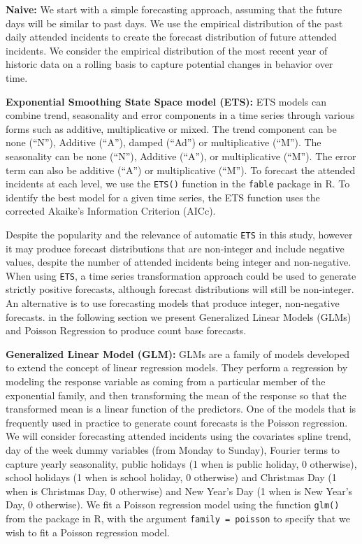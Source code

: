 \documentclass[
  authoryear,
  preprint,
  3p]{elsarticle}
\begin{document}
\textbf{Naive:} We start with a simple forecasting approach, assuming
that the future days will be similar to past days. We use the empirical
distribution of the past daily attended incidents to create the forecast
distribution of future attended incidents. We consider the empirical
distribution of the most recent year of historic data on a rolling basis
to capture potential changes in behavior over
time.

\textbf{Exponential Smoothing State Space model (ETS):} ETS models
\citep{hyndman2021forecasting} can combine trend, seasonality and error
components in a time series through various forms such as additive,
multiplicative or mixed. The trend component can be none (``N''),
Additive (``A''), damped (``Ad'') or multiplicative (``M''). The
seasonality can be none (``N''), Additive (``A''), or multiplicative
(``M''). The error term can also be additive (``A'') or multiplicative
(``M''). To forecast the attended incidents at each level, we use the
\texttt{ETS()} function in the \texttt{fable} package \citep{fable2022}
in R. To identify the best model for a given time series, the ETS
function uses the corrected Akaike's Information Criterion (AICc).

Despite the popularity and the relevance of automatic \texttt{ETS} in
this study, however it may produce forecast distributions that are
non-integer and include negative values, despite the number of attended
incidents being integer and non-negative. When using \texttt{ETS}, a
time series transformation approach could be used to generate strictly
positive forecasts, although forecast distributions will still be
non-integer. An alternative is to use forecasting models that produce
integer, non-negative forecasts. in the following section we present
Generalized Linear Models (GLMs) and Poisson Regression to produce count
base forecasts.

\textbf{Generalized Linear Model (GLM):} GLMs are a family of models
developed to extend the concept of linear regression models. They
perform a regression by modeling the response variable as coming from a
particular member of the exponential family, and then transforming the
mean of the response so that the transformed mean is a linear function
of the predictors. One of the models that is frequently used in practice
to generate count forecasts is the Poisson regression. We will consider
forecasting attended incidents using the covariates spline trend, day of
the week dummy variables (from Monday to Sunday), Fourier terms to
capture yearly seasonality, public holidays (1 when is public holiday, 0
otherwise), school holidays (1 when is school holiday, 0 otherwise) and
Christmas Day (1 when is Christmas Day, 0 otherwise) and New Year's Day
(1 when is New Year's Day, 0 otherwise). We fit a Poisson regression
model using the function \texttt{glm()} from the package in R, with the
argument \texttt{family\ =\ poisson} to specify that we wish to fit a
Poisson regression model.
\end{document}
